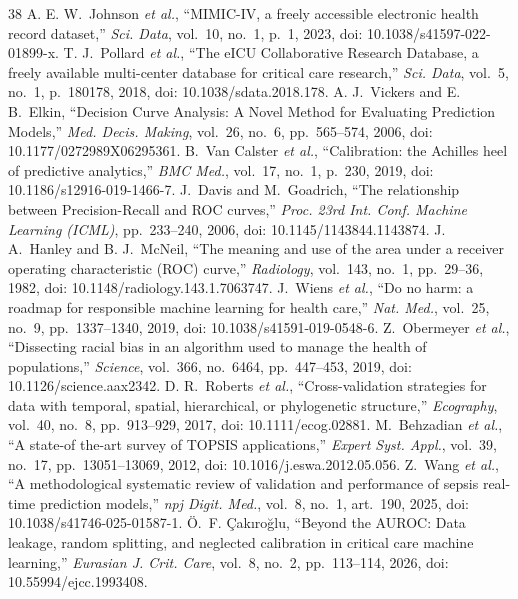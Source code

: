 \documentclass[preprint,12pt]{elsarticle}
\begin{document}
\begin{thebibliography}{38}
 A. E. W.~Johnson \textit{et al.}, ``MIMIC-IV, a freely accessible electronic health record dataset,'' \textit{Sci. Data}, vol.~10, no.~1, p.~1, 2023, doi: 10.1038/s41597-022-01899-x.
 T. J.~Pollard \textit{et al.}, ``The eICU Collaborative Research Database, a freely available multi-center database for critical care research,'' \textit{Sci. Data}, vol.~5, no.~1, p.~180178, 2018, doi: 10.1038/sdata.2018.178.
 A. J.~Vickers and E. B.~Elkin, ``Decision Curve Analysis: A Novel Method for Evaluating Prediction Models,'' \textit{Med. Decis. Making}, vol.~26, no.~6, pp.~565--574, 2006, doi: 10.1177/0272989X06295361.
 B.~Van Calster \textit{et al.}, ``Calibration: the Achilles heel of predictive analytics,'' \textit{BMC Med.}, vol.~17, no.~1, p.~230, 2019, doi: 10.1186/s12916-019-1466-7.
 J.~Davis and M.~Goadrich, ``The relationship between Precision-Recall and ROC curves,'' \textit{Proc. 23rd Int. Conf. Machine Learning (ICML)}, pp.~233--240, 2006, doi: 10.1145/1143844.1143874.
 J. A.~Hanley and B. J.~McNeil, ``The meaning and use of the area under a receiver operating characteristic (ROC) curve,'' \textit{Radiology}, vol.~143, no.~1, pp.~29--36, 1982, doi: 10.1148/radiology.143.1.7063747.
 J.~Wiens \textit{et al.}, ``Do no harm: a roadmap for responsible machine learning for health care,'' \textit{Nat. Med.}, vol.~25, no.~9, pp.~1337--1340, 2019, doi: 10.1038/s41591-019-0548-6.
 Z.~Obermeyer \textit{et al.}, ``Dissecting racial bias in an algorithm used to manage the health of populations,'' \textit{Science}, vol.~366, no.~6464, pp.~447--453, 2019, doi: 10.1126/science.aax2342.
 D. R.~Roberts \textit{et al.}, ``Cross-validation strategies for data with temporal, spatial, hierarchical, or phylogenetic structure,'' \textit{Ecography}, vol.~40, no.~8, pp.~913--929, 2017, doi: 10.1111/ecog.02881.
 M.~Behzadian \textit{et al.}, ``A state-of the-art survey of TOPSIS applications,'' \textit{Expert Syst. Appl.}, vol.~39, no.~17, pp.~13051--13069, 2012, doi: 10.1016/j.eswa.2012.05.056.
 Z.~Wang \textit{et al.}, ``A methodological systematic review of validation and performance of sepsis real-time prediction models,'' \textit{npj Digit. Med.}, vol.~8, no.~1, art.~190, 2025, doi: 10.1038/s41746-025-01587-1.
 \"{O}.~F. \c{C}ak\i{}ro\u{g}lu, ``Beyond the AUROC: Data leakage, random splitting, and neglected calibration in critical care machine learning,'' \textit{Eurasian J. Crit. Care}, vol.~8, no.~2, pp.~113--114, 2026, doi: 10.55994/ejcc.1993408.

\end{thebibliography}
\end{document}
